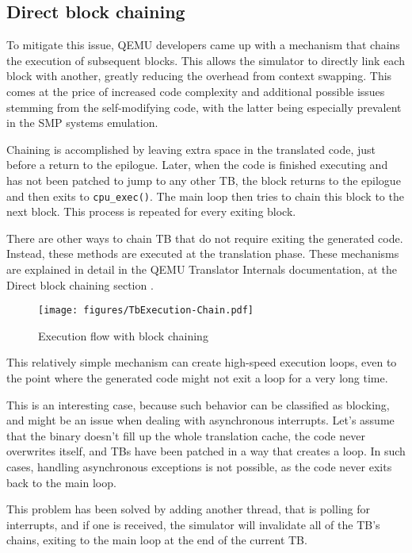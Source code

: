 \subsection*{Direct block chaining}

To mitigate this issue, QEMU developers came up with a mechanism that chains the execution of subsequent blocks. This allows the
simulator to directly link each block with another, greatly reducing the overhead from context swapping.
This comes at the price of increased code complexity and additional possible issues stemming from the
self-modifying code, with the latter being especially prevalent in the SMP systems emulation.

Chaining is accomplished by leaving extra space in the translated code, just before a return to the epilogue. Later, when
the code is finished executing and has not been patched to jump to any other TB, the block returns to the epilogue and then
exits to \texttt{cpu\_exec()}. The main loop then tries to chain this block to the next block. This
process is repeated for every exiting block.

There are other ways to chain TB that do not require exiting the generated code. Instead, these methods are executed at the
translation phase. These mechanisms are explained in detail in the QEMU Translator Internals documentation,
at the Direct block chaining section \cite{QemuDocsChaining}.

\pagebreak

\begin{figure}[h]
	\centering
    \label{fig:qemu-execution-with-blocks}
	\texttt{[image: figures/TbExecution-Chain.pdf]}
	\caption{Execution flow with block chaining}
\end{figure}

\noindent
This relatively simple mechanism can create high-speed execution loops, even to the point where the generated code
might not exit a loop for a very long time.

This is an interesting case, because such behavior can be classified as
blocking, and might be an issue when dealing with asynchronous interrupts. Let's assume that the binary doesn't fill up
the whole translation cache, the code never overwrites itself, and TBs have been patched in a way that creates a
loop. In such cases, handling asynchronous exceptions is not possible, as the code never exits back to the main loop.

This problem has been solved by adding another thread, that is polling for interrupts, and if one is received, the
simulator will invalidate all of the TB's chains, exiting to the main loop at the end of the current TB.

